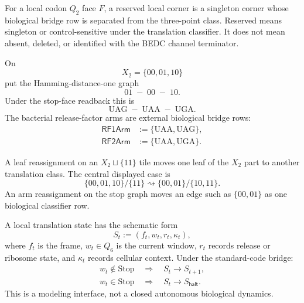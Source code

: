\begin{definition}
\label{def:philosophy-reserved-local-corner}
For a local codon $Q_{2}$ face $F$, a reserved local corner is a singleton
corner whose biological bridge row is separated from the three-point
class. Reserved means singleton or control-sensitive under the translation
classifier. It does not mean absent, deleted, or identified with the BEDC
channel terminator.
\end{definition}

\begin{definition}
\label{def:philosophy-stop-graph-and-rf-arms}
On
$$
  X_{2}=\{00,01,10\}
$$
put the Hamming-distance-one graph
$$
  01\;-\;00\;-\;10.
$$
Under the stop-face readback this is
$$
  \mathrm{UAG}\;-\;\mathrm{UAA}\;-\;\mathrm{UGA}.
$$
The bacterial release-factor arms are external biological bridge rows:
$$
\begin{aligned}
  \mathsf{RF1Arm}&:=\{\mathrm{UAA},\mathrm{UAG}\},\\
  \mathsf{RF2Arm}&:=\{\mathrm{UAA},\mathrm{UGA}\}.
\end{aligned}
$$
\end{definition}

\begin{definition}
\label{def:philosophy-local-reassignment-modes}
A leaf reassignment on an $X_{2}\sqcup\{11\}$ tile moves one leaf of the
$X_{2}$ part to another translation class. The central displayed case is
$$
  \{00,01,10\}/\{11\}
  \rightsquigarrow
  \{00,01\}/\{10,11\}.
$$
An arm reassignment on the stop graph moves an edge such as
$\{00,01\}$ as one biological classifier row.
\end{definition}

\begin{definition}
\label{def:philosophy-boundary-tile-finite-state-skeleton}
A local translation state has the schematic form
$$
  S_{t}:=(f_{t},w_{t},r_{t},\kappa_{t}),
$$
where $f_{t}$ is the frame, $w_{t}\in Q_{6}$ is the current window,
$r_{t}$ records release or ribosome state, and $\kappa_{t}$ records
cellular context. Under the standard-code bridge:
$$
\begin{gathered}
  w_{t}\notin\mathrm{Stop}
    \quad\Longrightarrow\quad S_{t}\to S_{t+1},\\
  w_{t}\in\mathrm{Stop}
    \quad\Longrightarrow\quad S_{t}\to S_{\mathsf{halt}}.
\end{gathered}
$$
This is a modeling interface, not a closed autonomous biological dynamics.
\end{definition}

